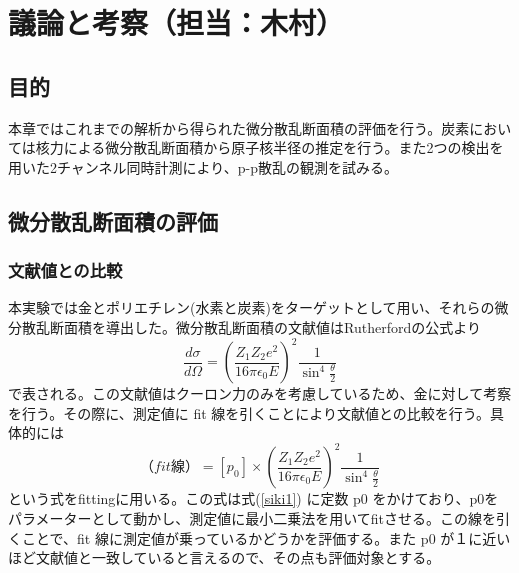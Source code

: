 \documentclass[a4paper,11pt,dvipdfmx]{jsarticle}
\begin{document}
\newpage
\section{\LARGE{議論と考察（担当：木村）}}

\subsection{目的}
本章ではこれまでの解析から得られた微分散乱断面積の評価を行う。炭素においては核力による微分散乱断面積から原子核半径の推定を行う。また2つの検出を用いた2チャンネル同時計測により、p-p散乱の観測を試みる。

\subsection{微分散乱断面積の評価}
\subsubsection{文献値との比較}
本実験では金とポリエチレン(水素と炭素)をターゲットとして用い、それらの微分散乱断面積を導出した。微分散乱断面積の文献値はRutherfordの公式より
\begin{equation}
    \frac{d\sigma}{d\Omega} = \left(\frac{Z_1Z_2e^2}{16\pi\epsilon_0E}\right)^2\frac{1}{\sin^4{\frac{\theta}{2}}}
    \label{siki1}
\end{equation}
で表される。この文献値はクーロン力のみを考慮しているため、金に対して考察を行う。その際に、測定値に fit 線を引くことにより文献値との比較を行う。具体的には
\begin{equation}
    （fit線） = [p_0] \times \left(\frac{Z_1Z_2e^2}{16\pi\epsilon_0E}\right)^2\frac{1}{\sin^4{\frac{\theta}{2}}}
    \label{crosssection}
\end{equation}
という式をfittingに用いる。この式は式(\ref{siki1}) に定数 p0 をかけており、p0をパラメーターとして動かし、測定値に最小二乗法を用いてfitさせる。この線を引くことで、fit 線に測定値が乗っているかどうかを評価する。また p0 が１に近いほど文献値と一致していると言えるので、その点も評価対象とする。
\end{document}
